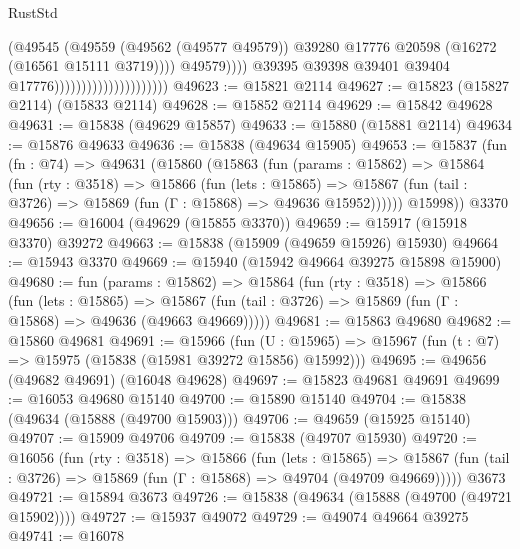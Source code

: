 \begin{lexlean}{RustStd}
\begin{coremodule}
                                                      (@49545
                                                        (@49559
                                                          (@49562 (@49577 @49579))
                                                          @39280
                                                          @17776
                                                          @20598
                                                          (@16272 (@16561 @15111 @3719))))
                                                      @49579))))
                                              @39395
                                              @39398
                                              @39401
                                              @39404
                                              @17776)))))))))))))))))))))
@49623 := @15821 @2114
@49627 := @15823 (@15827 @2114) (@15833 @2114)
@49628 := @15852 @2114
@49629 := @15842 @49628
@49631 := @15838 (@49629 @15857)
@49633 := @15880 (@15881 @2114)
@49634 := @15876 @49633
@49636 := @15838 (@49634 @15905)
@49653 := @15837
    (fun (fn : @74) =>
    @49631
      (@15860
        (@15863
          (fun (params : @15862) =>
          @15864
            (fun (rty : @3518) =>
            @15866
              (fun (lets : @15865) =>
              @15867 (fun (tail : @3726) => @15869 (fun (Γ : @15868) => @49636 @15952))))))
        @15998))
    @3370
@49656 := @16004 (@49629 (@15855 @3370))
@49659 := @15917 (@15918 @3370) @39272
@49663 := @15838 (@15909 (@49659 @15926) @15930)
@49664 := @15943 @3370
@49669 := @15940 (@15942 @49664 @39275 @15898 @15900)
@49680 := fun (params : @15862) =>
  @15864
    (fun (rty : @3518) =>
    @15866
      (fun (lets : @15865) =>
      @15867 (fun (tail : @3726) => @15869 (fun (Γ : @15868) => @49636 (@49663 @49669)))))
@49681 := @15863 @49680
@49682 := @15860 @49681
@49691 := @15966
    (fun (U : @15965) => @15967 (fun (t : @7) => @15975 (@15838 (@15981 @39272 @15856) @15992)))
@49695 := @49656 (@49682 @49691) (@16048 @49628)
@49697 := @15823 @49681 @49691
@49699 := @16053 @49680 @15140
@49700 := @15890 @15140
@49704 := @15838 (@49634 (@15888 (@49700 @15903)))
@49706 := @49659 (@15925 @15140)
@49707 := @15909 @49706
@49709 := @15838 (@49707 @15930)
@49720 := @16056
    (fun (rty : @3518) =>
    @15866
      (fun (lets : @15865) =>
      @15867 (fun (tail : @3726) => @15869 (fun (Γ : @15868) => @49704 (@49709 @49669)))))
    @3673
@49721 := @15894 @3673
@49726 := @15838 (@49634 (@15888 (@49700 (@49721 @15902))))
@49727 := @15937 @49072
@49729 := @49074 @49664 @39275
@49741 := @16078

\end{coremodule}
\end{lexlean}

